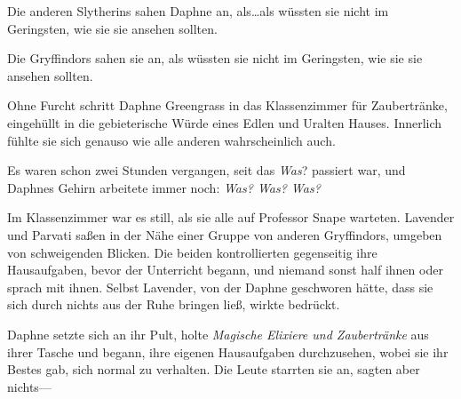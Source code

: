 
Die anderen Slytherins sahen Daphne an, als…als wüssten sie nicht im Geringsten, wie sie sie ansehen sollten.

Die Gryffindors sahen sie an, als wüssten sie nicht im Geringsten, wie sie sie ansehen sollten.

Ohne Furcht schritt Daphne Greengrass in das Klassenzimmer für Zaubertränke, eingehüllt in die gebieterische Würde eines Edlen und Uralten Hauses. Innerlich fühlte sie sich genauso wie alle anderen wahrscheinlich auch.

Es waren schon zwei Stunden vergangen, seit das \emph{Was}? passiert war, und Daphnes Gehirn arbeitete immer noch: \emph{Was? Was? Was?}

Im Klassenzimmer war es still, als sie alle auf Professor Snape warteten. Lavender und Parvati saßen in der Nähe einer Gruppe von anderen Gryffindors, umgeben von schweigenden Blicken. Die beiden kontrollierten gegenseitig ihre Hausaufgaben, bevor der Unterricht begann, und niemand sonst half ihnen oder sprach mit ihnen. Selbst Lavender, von der Daphne geschworen hätte, dass sie sich durch nichts aus der Ruhe bringen ließ, wirkte bedrückt.

Daphne setzte sich an ihr Pult, holte \emph{Magische Elixiere und Zaubertränke} aus ihrer Tasche und begann, ihre eigenen Hausaufgaben durchzusehen, wobei sie ihr Bestes gab, sich normal zu verhalten. Die Leute starrten sie an, sagten aber nichts—


